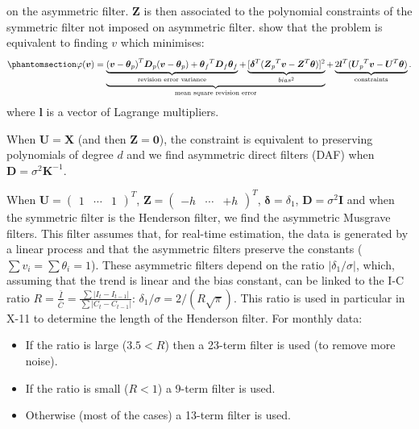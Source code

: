 \documentclass[
]{article}
\newcommand\transp[1]{{#1}^T}
\newcommand\1{\mathds{1}}
\begin{document}
on the asymmetric filter. \(\boldsymbol Z\) is then associated to the
polynomial constraints of the symmetric filter not imposed on asymmetric
filter. \textcite{proietti2008} show that the problem is equivalent to
finding \(v\) which minimises:
\begin{equation}\phantomsection\label{eq-lppasym}{
\varphi(\boldsymbol v)=
\underbrace{
  \underbrace{\transp{(\boldsymbol v-\boldsymbol \theta_{p})}\boldsymbol D_{p}(\boldsymbol v-\boldsymbol \theta_{p})+
  \transp{\boldsymbol \theta_{f}}\boldsymbol D_{f}\boldsymbol \theta_{f}}_\text{revision error variance}+
  \underbrace{[\transp{\boldsymbol \delta}(\transp{\boldsymbol Z_{p}}\boldsymbol v-\transp{\boldsymbol Z}\boldsymbol \theta)]^{2}}_{bias^2}
}_\text{mean square revision error}+
\underbrace{2\transp{\boldsymbol l}(\transp{\boldsymbol U_{p}}\boldsymbol v-\transp{\boldsymbol U}\boldsymbol \theta)}_{\text{constraints}}.
}\end{equation} where \(\boldsymbol l\) is a vector of Lagrange
multipliers.

When \(\boldsymbol U=\boldsymbol X\) (and then
\(\boldsymbol Z = \boldsymbol 0\)), the constraint is equivalent to
preserving polynomials of degree \(d\) and we find asymmetric direct
filters (DAF) when \(\boldsymbol D=\sigma^2\boldsymbol K^{-1}\).

When \(\boldsymbol U=\transp{\begin{pmatrix}1&\cdots&1\end{pmatrix}}\),
\(\boldsymbol Z=\transp{\begin{pmatrix}-h&\cdots&+h\end{pmatrix}}\),
\(\boldsymbol \delta=\delta_1\), \(\boldsymbol D=\sigma^2\boldsymbol I\)
and when the symmetric filter is the Henderson filter, we find the
asymmetric Musgrave filters. This filter assumes that, for real-time
estimation, the data is generated by a linear process and that the
asymmetric filters preserve the constants
(\(\sum v_i=\sum \theta_i=1\)). These asymmetric filters depend on the
ratio \(\lvert\delta_1/\sigma\rvert\), which, assuming that the trend is
linear and the bias constant, can be linked to the I-C ratio
\(R=\frac{\bar{I}}{\bar{C}}=\frac{\sum\lvert I_t-I_{t-1}\rvert}{\sum\lvert C_t-C_{t-1}\rvert}\):
\(\delta_1/\sigma=2/(R\sqrt{\pi})\). This ratio is used in particular in
X-11 to determine the length of the Henderson filter. For monthly data:

\begin{itemize}
\item
  If the ratio is large (\(3.5< R\)) then a 23-term filter is used (to
  remove more noise).
\item
  If the ratio is small (\(R<1\)) a 9-term filter is used.
\item
  Otherwise (most of the cases) a 13-term filter is used.
\end{itemize}
\end{document}
